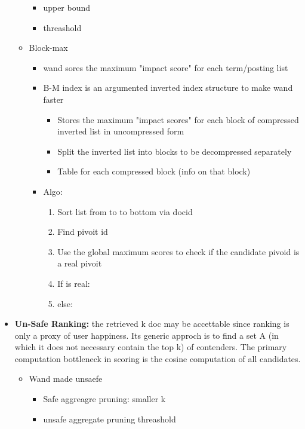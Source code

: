 \begin{itemize}
\begin{itemize}
\begin{itemize}
            \item upper bound
            \item threashold
        \end{itemize}
        \item Block-max
        \begin{itemize}
            \item wand sores the maximum "impact score" for each term/posting list
            \item B-M index is an argumented inverted index structure to make wand faster
            \begin{itemize}
                \item Stores the maximum "impact scores" for each block of compressed inverted list in uncompressed form
                \item Split the inverted list into blocks to be decompressed separately
                \item Table for each compressed block (info on that block)
            \end{itemize}
            \item Algo:
            \begin{enumerate}
                \item Sort list from to to bottom via docid
                \item Find pivoit id
                \item Use the global maximum scores to check if the candidate pivoid is a real pivoit
                \item If is real:
                \item else: 
            \end{enumerate}
        \end{itemize}
    \end{itemize}
    \item \textbf{Un-Safe Ranking:} the retrieved k doc may be accettable since ranking is only a proxy of user happiness. Its generic approch is to find a set A (in which it does not necessary contain the top k) of contenders. The primary computation bottleneck in scoring is the cosine computation of all candidates.
    \begin{itemize}
        \item Wand made unsaefe
        \begin{itemize}
            \item Safe aggreagre pruning: smaller k
            \item unsafe aggregate pruning threashold

\end{itemize}
\end{itemize}
\end{itemize}
